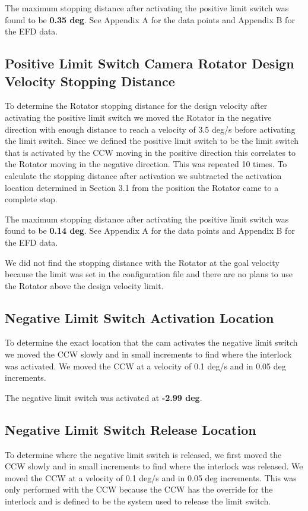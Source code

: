 \documentclass[SE,lsstdraft,authoryear,toc]{lsstdoc}
\begin{document}
The maximum stopping distance after activating the positive limit switch
was found to be \textbf{0.35 deg}. See Appendix A for the data points
and Appendix B for the EFD data.

\subsection{Positive Limit Switch Camera Rotator Design Velocity Stopping Distance}

To determine the Rotator stopping distance for the design velocity after
activating the positive limit switch we moved the Rotator in the
negative direction with enough distance to reach a velocity of 3.5 deg/s
before activating the limit switch. Since we defined the positive limit
switch to be the limit switch that is activated by the CCW moving in the
positive direction this correlates to the Rotator moving in the negative
direction. This was repeated 10 times. To calculate the stopping
distance after activation we subtracted the activation location
determined in Section 3.1 from the position the Rotator came to a
complete stop.

The maximum stopping distance after activating the positive limit switch
was found to be \textbf{0.14 deg}. See Appendix A for the data points
and Appendix B for the EFD data.

We did not find the stopping distance with the Rotator at the goal
velocity because the limit was set in the configuration file and there
are no plans to use the Rotator above the design velocity limit.

\subsection{Negative Limit Switch Activation Location}

To determine the exact location that the cam activates the negative
limit switch we moved the CCW slowly and in small increments to find
where the interlock was activated. We moved the CCW at a velocity of 0.1
deg/s and in 0.05 deg increments.

The negative limit switch was activated at \textbf{-2.99 deg}.

\subsection{Negative Limit Switch Release Location}

To determine where the negative limit switch is released, we first moved
the CCW slowly and in small increments to find where the interlock was
released. We moved the CCW at a velocity of 0.1 deg/s and in 0.05 deg
increments. This was only performed with the CCW because the CCW has the
override for the interlock and is defined to be the system used to
release the limit switch.
\end{document}
